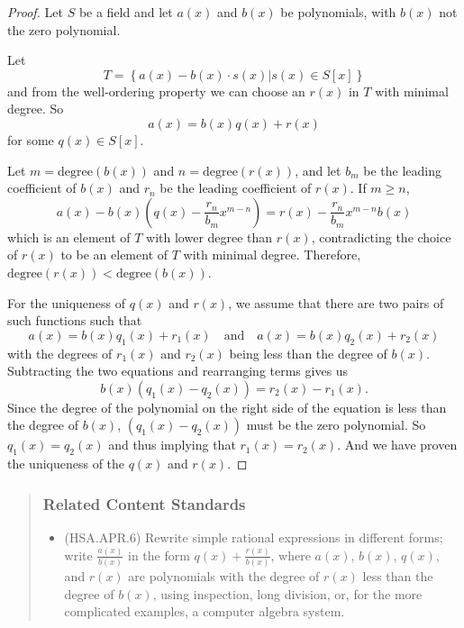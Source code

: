 \documentclass[
]{book}
\providecommand{\tightlist}{%
  \setlength{\itemsep}{0pt}\setlength{\parskip}{0pt}}
\theoremstyle{definition}
\theoremstyle{definition}
\theoremstyle{definition}
\theoremstyle{remark}
\begin{document}
\begin{proof}
{}Let \(S\) be a field and let \(a(x)\) and \(b(x)\) be polynomials, with \(b(x)\) not the zero polynomial.

Let
\[T= \left\{ a(x)-b(x)\cdot s(x) | s(x) \in S[x]\right\}\] and from the well-ordering property we can choose an \(r(x)\) in \(T\) with minimal degree. So \[a(x)=b(x) q(x) + r(x)\] for some \(q(x)\in S[x]\).

Let \(m=\mathrm{degree}(b(x))\) and \(n=\mathrm{degree}(r(x))\), and let \(b_m\) be the leading coefficient of \(b(x)\) and \(r_n\) be the leading coefficient of \(r(x)\). If \(m\geq n\),
\[a(x)-b(x)\left(q(x)- \frac{r_n}{b_m} x^{m-n}\right)= r(x)-\frac{r_n}{b_m} x^{m-n} b(x) \] which is an element of \(T\) with lower degree than \(r(x)\), contradicting the choice of \(r(x)\) to be an element of \(T\) with minimal degree. Therefore, \(\mathrm{degree}(r(x))<\mathrm{degree}(b(x))\).

For the uniqueness of \(q(x)\) and \(r(x)\), we assume that there are two pairs of such functions such that
\[a(x)=b(x) q_1(x)+r_1(x) \quad \mbox{and} \quad a(x)=b(x) q_2(x)+r_2(x)\] with the degrees of \(r_1(x)\) and \(r_2(x)\) being less than the degree of \(b(x)\). Subtracting the two equations and rearranging terms gives us \[b(x) \left( q_1(x)-q_2(x) \right) = r_2(x)-r_1(x).\] Since the degree of the polynomial on the right side of the equation is less than the degree of \(b(x)\), \((q_1(x)-q_2(x))\) must be the zero polynomial. So \(q_1(x)= q_2(x)\) and thus implying that \(r_1(x)=r_2(x)\). And we have proven the uniqueness of the \(q(x)\) and \(r(x)\).
\end{proof}

\begin{quote}
\hypertarget{related-content-standards-32}{%
\subsubsection*{Related Content Standards}\label{related-content-standards-32}}

\begin{itemize}
\tightlist
\item
  (HSA.APR.6) Rewrite simple rational expressions in different forms; write \(\frac{a(x)}{b(x)}\) in the form \(q(x)+\frac{r(x)}{b(x)}\), where \(a(x)\), \(b(x)\), \(q(x)\), and \(r(x)\) are polynomials with the degree of \(r(x)\) less than the degree of \(b(x)\), using inspection, long division, or, for the more complicated examples, a computer algebra system.
\end{itemize}
\end{quote}
\end{document}
